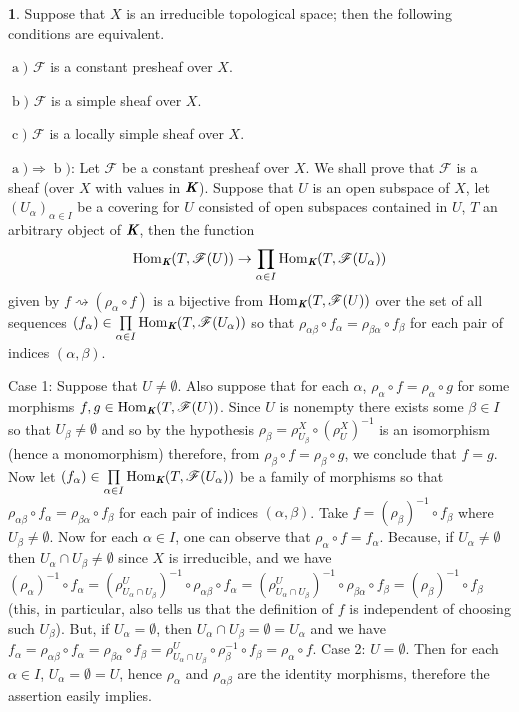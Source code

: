 \documentclass[12pt]{amsart}
\newcommand{\Hom}{\operatorname{Hom}}
\newcommand{\leta}{\operatorname{a}}
\newcommand{\letb}{\operatorname{b}}
\newcommand{\letc}{\operatorname{c}}
\theoremstyle{definition}
\newtheorem{bk}[proposition]{}
\begin{document}
\begin{bk}\label{I: 3.6.2} Suppose that $X$ is an irreducible topological space; then the following conditions are equivalent. 

$\leta)$ $\mathscr{F}$ is a constant presheaf over $X$.

$\letb)$ $\mathscr{F}$ is a simple sheaf over $X$.

$\letc)$ $\mathscr{F}$ is a locally simple sheaf over $X$.


$\leta)\Rightarrow\letb)$: Let $\mathscr{F}$ be a constant presheaf over $X$. We shall prove that $\mathscr{F}$ is a sheaf (over $X$ with values in $\emph{\textbf{K}}$). Suppose that $U$ is an open subspace of $X$, let $(U_{\alpha})_{\alpha\in I}$ be a covering for $U$ consisted of open subspaces contained in $U$, $T$ an arbitrary object of $\emph{\textbf{K}}$, then the function $$\Hom_{\emph{\textbf{K}}}(T,\mathscr{F}(U))
\rightarrow\prod\limits_{\alpha\in I} \Hom_{\emph{\textbf{K}}}(T,\mathscr{F}(U_{\alpha}))$$ given by $f\rightsquigarrow(\rho_{\alpha}\circ f)$ is a bijective from $\Hom_{\emph{\textbf{K}}}(T,\mathscr{F}(U))$ over the set of all sequences $(f_{\alpha})\in\prod\limits_{\alpha\in I} \Hom_{\emph{\textbf{K}}}(T,\mathscr{F}(U_{\alpha}))$ so that $\rho_{\alpha\beta}\circ f_{\alpha}=\rho_{\beta\alpha}\circ f_{\beta}$ for each pair of indices $(\alpha,\beta)$.

Case 1: Suppose that $U\neq\emptyset$. Also suppose that for each $\alpha$, $\rho_{\alpha}\circ f=\rho_{\alpha}\circ g$ for some morphisms $f, g\in\Hom_{\emph{\textbf{K}}}(T,\mathscr{F}(U))$. Since $U$ is nonempty there exists some $\beta\in I$ so that $U_{\beta}\neq\emptyset$ and so by the hypothesis $\rho_{\beta}=\rho_{U_{\beta}}^{X}\circ(\rho_{U}^{X})^{-1}$ is an isomorphism (hence a monomorphism) therefore, from $\rho_{\beta}\circ f=\rho_{\beta}\circ g$, we conclude that $f=g$. Now let $(f_{\alpha})\in\prod\limits_{\alpha\in I} \Hom_{\emph{\textbf{K}}}(T,\mathscr{F}(U_{\alpha}))$ be a family of morphisms so that $\rho_{\alpha\beta}\circ f_{\alpha}=\rho_{\beta\alpha}\circ f_{\beta}$ for each pair of indices $(\alpha,\beta)$. Take $f=(\rho_{\beta})^{-1}\circ f_{\beta}$ where $U_{\beta}\neq\emptyset$. Now for each $\alpha\in I$, one can observe that $\rho_{\alpha}\circ f=f_{\alpha}$. Because, if $U_{\alpha}\neq\emptyset$ then $U_{\alpha}\cap U_{\beta}\neq\emptyset$ since $X$ is irreducible, and we have $(\rho_{\alpha})^{-1}\circ f_{\alpha}=(\rho_{U_{\alpha}\cap U_{\beta}}^{U})^{-1}\circ\rho_{\alpha\beta}\circ f_{\alpha}=(\rho_{U_{\alpha}\cap U_{\beta}}^{U})^{-1}\circ\rho_{\beta\alpha}\circ f_{\beta}=(\rho_{\beta})^{-1}\circ f_{\beta}$ (this, in particular, also tells us that the definition of $f$ is independent of choosing such  $U_{\beta}$). But, if $U_{\alpha}=\emptyset$, then $U_{\alpha}\cap U_{\beta}=\emptyset=U_{\alpha}$ and we have $f_{\alpha}=\rho_{\alpha\beta}\circ f_{\alpha}=\rho_{\beta\alpha}\circ f_{\beta}=\rho_{U_{\alpha}\cap U_{\beta}}^{U}\circ\rho_{\beta}^{-1}\circ f_{\beta}=\rho_{\alpha}\circ f$.
 Case 2: $U=\emptyset$. Then for each $\alpha\in I$, $U_{\alpha}=\emptyset=U$, hence $\rho_{\alpha}$ and $\rho_{\alpha\beta}$ are the identity morphisms, therefore the assertion easily implies.


\end{bk}
\end{document}
